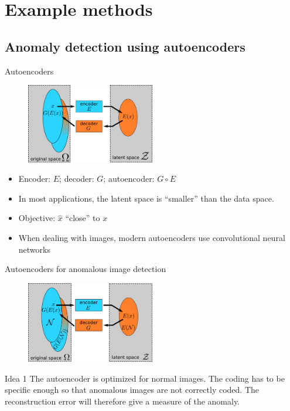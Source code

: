 \documentclass[xcolor=pdftex,dvipsnames,table,mathserif]{beamer}
\begin{document}
\section{Example methods}

\subsection{Anomaly detection using autoencoders}


\begin{frame}{Autoencoders}

  \begin{figure}[ht]
    \centering
    \includegraphics[width=0.5\textwidth]{ae.png}
  \end{figure}

  \begin{itemize}
  \item Encoder: $E$; decoder: $G$; autoencoder: $G \circ E$
  \item In most applications, the latent space is ``smaller'' than the data space.
  \item Objective: $\hat{x}$ ``close'' to $x$
  \item When dealing with images, modern autoencoders use convolutional neural networks
  \end{itemize}

\end{frame}

\begin{frame}{Autoencoders for anomalous image detection}

  \begin{figure}[ht]
    \centering
    \includegraphics[width=0.5\textwidth]{ae_ano.png}
  \end{figure}

  \begin{block}{Idea 1}
    The autoencoder is optimized for normal images. The coding has to be specific enough so that anomalous images are not correctly coded. The reconstruction error will therefore give a measure of the anomaly.
  \end{block}

\end{frame}
\end{document}
